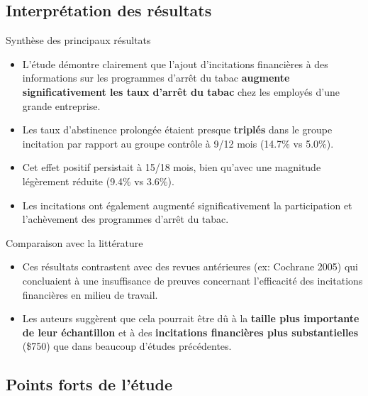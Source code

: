 \documentclass[aspectratio=169,xcolor=dvipsnames]{beamer}
\begin{document}
\subsection{Interprétation des résultats}

\begin{frame}{Synthèse des principaux résultats}
    \begin{itemize}
        \item L'étude démontre clairement que l'ajout d'incitations financières à des informations sur les programmes d'arrêt du tabac \textbf{augmente significativement les taux d'arrêt du tabac} chez les employés d'une grande entreprise.
        \item Les taux d'abstinence prolongée étaient presque \textbf{triplés} dans le groupe incitation par rapport au groupe contrôle à 9/12 mois (14.7\% vs 5.0\%).
        \item Cet effet positif persistait à 15/18 mois, bien qu'avec une magnitude légèrement réduite (9.4\% vs 3.6\%).
        \item Les incitations ont également augmenté significativement la participation et l'achèvement des programmes d'arrêt du tabac.
    \end{itemize}
    \begin{block}{Comparaison avec la littérature}
        \begin{itemize}
            \item Ces résultats contrastent avec des revues antérieures (ex: Cochrane 2005) qui concluaient à une insuffisance de preuves concernant l'efficacité des incitations financières en milieu de travail.
            \item Les auteurs suggèrent que cela pourrait être dû à la \textbf{taille plus importante de leur échantillon} et à des \textbf{incitations financières plus substantielles} (\$750) que dans beaucoup d'études précédentes.
        \end{itemize}
    \end{block}
\end{frame}

\subsection{Points forts de l'étude}
\end{document}
